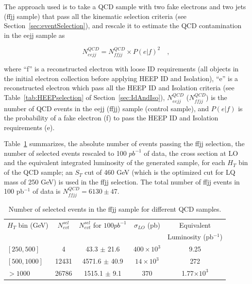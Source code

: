 The approach used is to take a QCD sample with two fake electrons and two jets (ffjj sample)
that pass all the kinematic selection criteria (see Section~\ref{sec:eventSelection}), and rescale it to estimate 
the QCD contamination in the eejj sample as

%
\begin{equation} \label{QCDRescaling}
N_{eejj}^{QCD} = N_{ffjj}^{QCD} \times {P(e|f)}^2 \quad , 
\end{equation}
%

where ``f'' is a reconstructed electron with loose ID requirements (all objects in the initial electron collection 
before applying HEEP ID and Isolation), 
``e'' is a reconstructed electron which pass all the HEEP ID and Isolation criteria (see Table~\ref{tab:HEEPselection} 
of Section~\ref{sec:IdAndIso}), 
$N_{eejj}^{QCD}$ ($N_{ffjj}^{QCD}$) is the number of QCD events in the eejj (ffjj) sample (control sample), 
and $P(e|f)$ is the probability of a fake electron (f) to pass the HEEP ID and Isolation requirements (e).

Table~\ref{tab:ffjjSelection} summarizes, 
the absolute number of events passing the ffjj selection, the number 
of selected events rescaled to 100 $pb^{-1}$ of data, the cross section at LO 
and the equivalent integrated luminosity of the generated sample, for each $H_T$ 
bin of the QCD sample; an $S_{T}$ cut of 460 GeV 
(which is the optimized cut for LQ mass of 250 GeV) is used in the ffjj selection.
The total number of ffjj events in 100 pb$^{-1}$ of data is $N_{ffjj}^{QCD}=6130 \pm 47$.

\begin{table}[htbp]
\begin{center}
\begin{tabular}{|l|c|c|c|c|}
\hline\hline
 $H_T$ bin (GeV)   & $N_{evt}^{sel}$ & $N_{evt}^{sel}$ for $100pb^{-1}$ & $\sigma_{LO}$ (pb) & Equivalent           \\
                         &                 &                                  &                    & Luminosity (pb$^{-1}$) \\
\hline\hline
$[250,500]$              &  4              & 43.3    $\pm$ 21.6               & $400 \times 10^3$  &  9.25                \\
$[500,1000]$             &  12431          & 4571.6  $\pm$ 40.9               & $14 \times 10^3$   &  272                 \\
$>1000$                  &  26786          & 1515.1  $\pm$ 9.1                & $370$              &  1.77$\times 10^3$   \\
\hline\hline
\end{tabular}
\end{center}
\caption{Number of selected events in the ffjj sample for different QCD samples.}
\label{tab:ffjjSelection}
\end{table}


